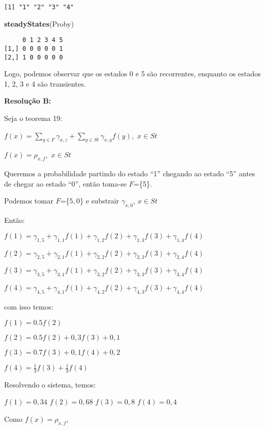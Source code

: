 \documentclass[
]{article}
\newenvironment{Shaded}{\begin{snugshade}}{\end{snugshade}}
\newcommand{\KeywordTok}[1]{\textcolor[rgb]{0.13,0.29,0.53}{\textbf{#1}}}
\newcommand{\NormalTok}[1]{#1}
\begin{document}
\begin{verbatim}
[1] "1" "2" "3" "4"
\end{verbatim}

\begin{Shaded}
\begin{Highlighting}[]
\KeywordTok{steadyStates}\NormalTok{(Proby)}
\end{Highlighting}
\end{Shaded}

\begin{verbatim}
     0 1 2 3 4 5
[1,] 0 0 0 0 0 1
[2,] 1 0 0 0 0 0
\end{verbatim}

Logo, podemos observar que os estados 0 e 5 são recorrentes, enquanto os
estados 1, 2, 3 e 4 são transientes.

\textbf{Resolução B:}

Seja o teorema 19:

\(f(x)=\sum_{y \in F}\gamma_{x,z}+\sum_{y \in St}\gamma_{x,y}f(y),\)
\(x \in St\)

\(f(x)=\rho_{x,f},\) \(x \in St\)

Queremos a probabilidade partindo do estado ``1'' chegando ao estado
``5'' antes de chegar ao estado ``0'', então toma-se \(F\)=\{5\}.

Podemos tomar \(F\)=\{\(5,0\)\} e substrair \(\gamma_{x,0}\),
\(x \in St\)

Então:

\(f(1) = \gamma_{1,5}+\gamma_{1,1}f(1)+\gamma_{1,2}f(2)+\gamma_{1,3}f(3)+\gamma_{1,4}f(4)\)

\(f(2) = \gamma_{2,5}+\gamma_{2,1}f(1)+\gamma_{2,2}f(2)+\gamma_{2,3}f(3)+\gamma_{2,4}f(4)\)

\(f(3) = \gamma_{3,5}+\gamma_{3,1}f(1)+\gamma_{3,2}f(2)+\gamma_{3,3}f(3)+\gamma_{3,4}f(4)\)

\(f(4) = \gamma_{4,5}+\gamma_{4,1}f(1)+\gamma_{4,2}f(2)+\gamma_{4,3}f(3)+\gamma_{4,4}f(4)\)

com isso temos:

\(f(1)=0.5f(2)\)

\(f(2)=0.5f(2)+0,3f(3)+0,1\)

\(f(3)=0.7f(3)+0,1f(4)+0,2\)

\(f(4)=\frac{1}{3}f(3)+\frac{1}{3}f(4)\)

Resolvendo o sistema, temos:

\(f(1)=0,34\) \(f(2)=0,68\) \(f(3)=0,8\) \(f(4)=0,4\)

Como \(f(x)=\rho_{x,f}\),
\end{document}
